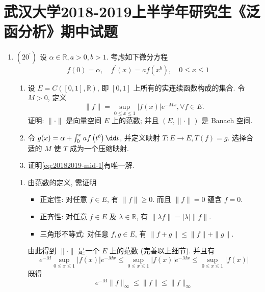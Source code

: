 \section{武汉大学2018-2019上半学年研究生《泛函分析》期中试题}
\begin{enumerate}
    \item $\left(20^{\prime}\right)$ 
    设 $\alpha \in \mathbb{R}, a>0, b>1$. 考虑如下微分方程
        \begin{equation}\label{eq:20182019-mid-1}
        f(0)=\alpha, \quad f^{\prime}(x)=a f\left(x^{b}\right), \quad 0 \leq x \leq 1
        \end{equation}
        \begin{enumerate}
            \item 设 $E=C([0,1], \mathbb{R})$, 即 $[0,1]$ 上所有的实连续函数构成的集合. 令 $M>0$, 定义
            \[
            \|f\|=\sup _{0 \leq x \leq 1}|f(x)| e^{-M x}, \forall f \in E .
            \]
            证明: $\|\cdot\|$ 是向量空间 $E$ 上的范数; 并且 $(E,\|\cdot\|)$ 是 Banach 空间.
            \item\label{problem:20182019-mid-1-2} 令 $g(x)=\alpha+\int_{0}^{x} a f\left(t^{b}\right) \dt $, 并定义映射 $T: E \rightarrow E, T(f)=g .$ 选择合适的 $M$ 使 $T$ 成为一个压缩映射.
            \item 证明\cref{eq:20182019-mid-1}有唯一解.
        \end{enumerate}
        \begin{answer}
            \begin{enumerate}
                \item 由范数的定义, 需证明
                \begin{itemize}
                    \item 正定性: 对任意 $f \in E$, 有 $\|f\| \geq 0$. 而且 $\|f\|=0$ 蕴含 $f=0$.
                    \item 正齐性: 对任意 $f \in E$ 及 $\lambda \in \mathbb{R}$, 有 $\|\lambda f\|=|\lambda|\|f\|$.
                    \item 三角形不等式: 对任意 $f, g \in E$, 有 $\|f+g\| \leq\|f\|+\|g\|$.
                \end{itemize}
                由此得到 $\|\cdot\|$ 是一个 $E$ 上的范数 (完善以上细节). 并且有
                \[
                e^{-M} \sup _{0 \leq x \leq 1}|f(x)| e^{-M x} \leq \sup _{0 \leq x \leq 1}|f(x)| e^{-M x} \leq \sup _{0 \leq x \leq 1}|f(x)|
                \]
                既得
                \[
                e^{-M}\|f\|_{\infty} \leq\|f\| \leq\|f\|_{\infty}
\]
\end{enumerate}
\end{answer}
\end{enumerate}
